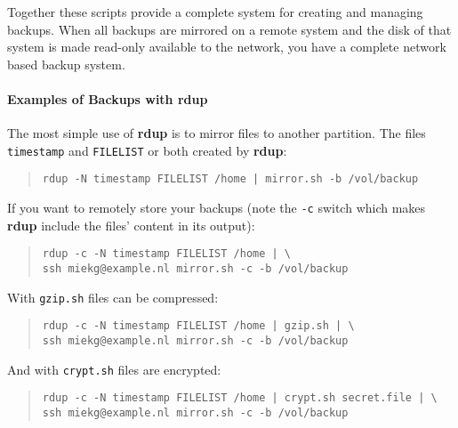 \documentclass[a4, 10pt]{article}
\newcommand{\rdup}{\textbf{rdup}}
\newcommand{\cmd}[1]{\texttt{#1}}
\begin{document}
Together these scripts provide a complete system
for creating and managing backups. When all backups are mirrored on a
remote system and the disk of that system is made read-only available to
the network, you have a complete network based backup system.

\paragraph{Examples of Backups with \rdup}
The most simple use of \rdup{} is to mirror files to
another partition. The files \cmd{timestamp} and \cmd{FILELIST} or
both created by \rdup:
\begin{quote}
\begin{verbatim}
rdup -N timestamp FILELIST /home | mirror.sh -b /vol/backup
\end{verbatim}
\end{quote}

\noindent If you want to remotely store your backups (note the \cmd{-c} switch which makes
\rdup{} include the files' content in its output):
\begin{quote}
\begin{verbatim}
rdup -c -N timestamp FILELIST /home | \
ssh miekg@example.nl mirror.sh -c -b /vol/backup
\end{verbatim}
\end{quote}

\noindent With \cmd{gzip.sh} files can be compressed:
\begin{quote}
\begin{verbatim}
rdup -c -N timestamp FILELIST /home | gzip.sh | \
ssh miekg@example.nl mirror.sh -c -b /vol/backup
\end{verbatim}
\end{quote}

\noindent And with \cmd{crypt.sh} files are encrypted:
\begin{quote}
\begin{verbatim}
rdup -c -N timestamp FILELIST /home | crypt.sh secret.file | \
ssh miekg@example.nl mirror.sh -c -b /vol/backup
\end{verbatim}
\end{quote}
\end{document}
